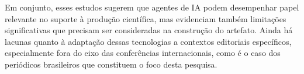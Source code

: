 Em conjunto, esses estudos sugerem que agentes de IA podem desempenhar papel relevante no suporte à produção científica, mas evidenciam também limitações significativas que precisam ser consideradas na construção do artefato. Ainda há lacunas quanto à adaptação dessas tecnologias a contextos editoriais específicos, especialmente fora do eixo das conferências internacionais, como é o caso dos periódicos brasileiros que constituem o foco desta pesquisa.



